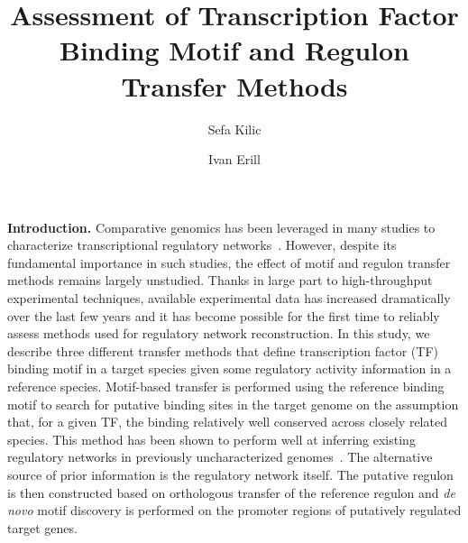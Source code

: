 \documentclass{llncs}
\begin{document}
\title{Assessment of Transcription Factor Binding Motif and Regulon Transfer
  Methods}
\author{Sefa Kilic \and Ivan Erill}

\maketitle
\textbf{Introduction.}  Comparative genomics has been leveraged in many studies
to characterize transcriptional regulatory
networks~\cite{ravcheev2013genomic,meireles2009comparative}. However, despite
its fundamental importance in such studies, the effect of motif and regulon
transfer methods remains largely unstudied. Thanks in large part to
high-throughput experimental techniques, available experimental data has
increased dramatically over the last few years and it has become possible for
the first time to reliably assess methods used for regulatory network
reconstruction. In this study, we describe three different transfer methods that
define transcription factor (TF) binding motif in a target species given some
regulatory activity information in a reference species. Motif-based transfer is
performed using the reference binding motif to search for putative binding sites
in the target genome on the assumption that, for a given TF, the binding
relatively well conserved across closely related species. This method has been
shown to perform well at inferring existing regulatory networks in previously
uncharacterized genomes~\cite{leyn2013genomic,leyn2014comparative}. The
alternative source of prior information is the regulatory network itself. The
putative regulon is then constructed based on orthologous transfer of the
reference regulon and \textit{de novo} motif discovery is performed on the
promoter regions of putatively regulated target genes.
\end{document}
